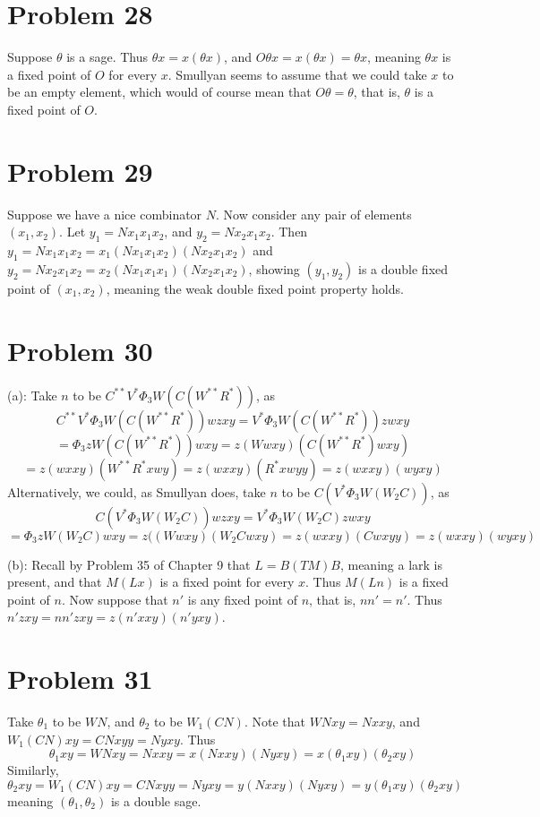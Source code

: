 \documentclass{article}
\theoremstyle{definition}
\begin{document}
\section*{Problem 28}
Suppose $\theta$ is a sage. Thus $\theta x=x(\theta x)$, and $O\theta x=x(\theta x)=\theta x$, meaning $\theta x$ is a fixed point of $O$ for every $x$. Smullyan seems to assume 
that we could take $x$ to be an empty element, which would of course mean that $O\theta=\theta$, that is, $\theta$ is a fixed point of $O$.

\section*{Problem 29}
Suppose we have a nice combinator $N$. Now consider any pair of elements $(x_1,x_2)$. Let $y_1=Nx_1x_1x_2$, and $y_2=Nx_2x_1x_2$. 
Then $y_1=Nx_1x_1x_2=x_1(Nx_1x_1x_2)(Nx_2x_1x_2)$ and $y_2=Nx_2x_1x_2=x_2(Nx_1x_1x_1)(Nx_2x_1x_2)$, showing $(y_1,y_2)$ is a double fixed point of 
$(x_1,x_2)$, meaning the weak double fixed point property holds.

\section*{Problem 30}
(a): Take $n$ to be $C^{**}V^*\Phi_3W(C(W^{**}R^*))$, as 
\[ C^{**}V^*\Phi_3W(C(W^{**}R^*))wzxy=V^*\Phi_3W(C(W^{**}R^*))zwxy \]
\[ =\Phi_3zW(C(W^{**}R^*))wxy=z(Wwxy)(C(W^{**}R^*)wxy) \]
\[ =z(wxxy)(W^{**}R^*xwy)=z(wxxy)(R^*xwyy)=z(wxxy)(wyxy) \]
Alternatively, we could, as Smullyan does, take $n$ to be $C(V^*\Phi_3W(W_2C))$, as
\[ C(V^*\Phi_3W(W_2C))wzxy=V^*\Phi_3W(W_2C)zwxy \]
\[ =\Phi_3zW(W_2C)wxy=z((Wwxy)(W_2Cwxy)=z(wxxy)(Cwxyy)=z(wxxy)(wyxy) \]


(b): Recall by Problem 35 of Chapter 9 that $L=B(TM)B$, meaning a lark is present, and that $M(Lx)$ is a fixed point for every $x$. Thus $M(Ln)$ is a fixed point of $n$. 
Now suppose that $n'$ is any fixed point of $n$, that is, $nn'=n'$. Thus $n'zxy=nn'zxy=z(n'xxy)(n'yxy)$.

\section*{Problem 31}
Take $\theta_1$ to be $WN$, and $\theta_2$ to be $W_1(CN)$. Note that $WNxy=Nxxy$, and $W_1(CN)xy=CNxyy=Nyxy$. Thus 
\[ \theta_1xy=WNxy=Nxxy=x(Nxxy)(Nyxy)=x(\theta_1 xy)(\theta_2 xy) \] Similarly,
\[ \theta_2xy=W_1(CN)xy=CNxyy=Nyxy=y(Nxxy)(Nyxy)=y(\theta_1 xy)(\theta_2 xy) \] meaning $(\theta_1,\theta_2)$ is a double sage.
\end{document}
